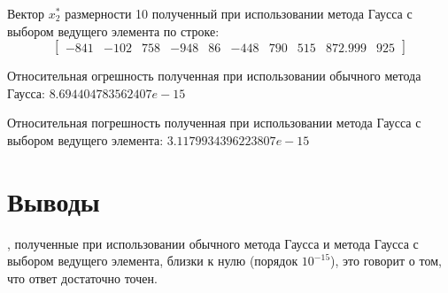 \documentclass[12pt]{report}
\begin{document}
Вектор $x_{2}^*$ размерности 10 полученный при использовании метода Гаусса с выбором ведущего элемента по строке:
\[
\begin{bmatrix}
   -841 & -102 & 758 & -948 & 86 & -448 & 790 & 515 & 872.999 & 925
\end{bmatrix}
\]

Относительная огрешность полученная при использовании обычного метода Гаусса: $8.694404783562407e-15$

Относительная погрешность полученная при использовании метода Гаусса с выбором ведущего элемента: $3.1179934396223807e-15$

\section{Выводы}

, полученные при использовании обычного метода Гаусса и метода Гаусса с выбором ведущего элемента, близки к нулю (порядок $10^{-15}$), это говорит о том, что ответ достаточно точен.
\end{document}
